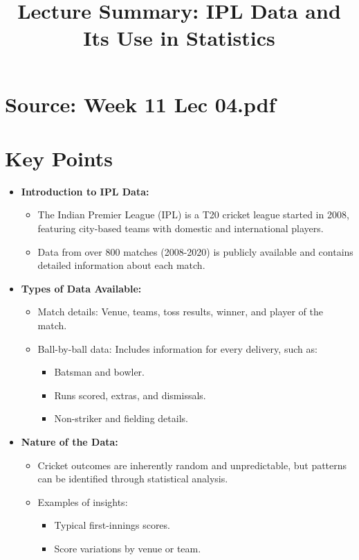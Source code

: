 \documentclass{article}
\title{Lecture Summary: IPL Data and Its Use in Statistics}
\author{}
\date{}
\begin{document}
\maketitle

\section*{Source: Week 11 Lec 04.pdf}

\section*{Key Points}

\begin{itemize}
  \item \textbf{Introduction to IPL Data:}
    \begin{itemize}
      \item The Indian Premier League (IPL) is a T20 cricket league started in 2008, featuring city-based teams with domestic and international players.
      \item Data from over 800 matches (2008-2020) is publicly available and contains detailed information about each match.
    \end{itemize}

  \item \textbf{Types of Data Available:}
    \begin{itemize}
      \item Match details: Venue, teams, toss results, winner, and player of the match.
      \item Ball-by-ball data: Includes information for every delivery, such as:
        \begin{itemize}
          \item Batsman and bowler.
          \item Runs scored, extras, and dismissals.
          \item Non-striker and fielding details.
        \end{itemize}
    \end{itemize}

  \item \textbf{Nature of the Data:}
    \begin{itemize}
      \item Cricket outcomes are inherently random and unpredictable, but patterns can be identified through statistical analysis.
      \item Examples of insights:
        \begin{itemize}
          \item Typical first-innings scores.
          \item Score variations by venue or team.
        \end{itemize}
    \end{itemize}


\end{itemize}
\end{document}
